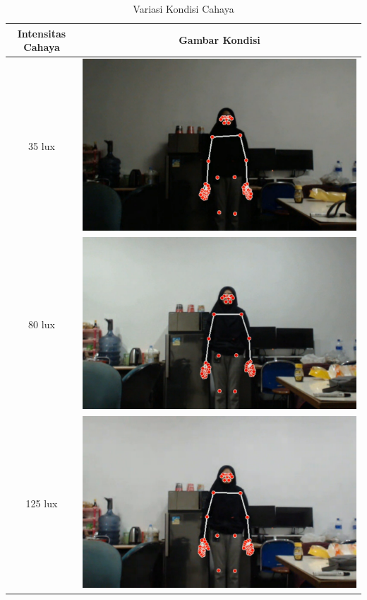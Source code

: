 \begin{longtable}{|c|c|}
  \caption{Variasi Kondisi Cahaya}
  \label{tb:kondisicahaya}                                   \\
  \hline
  \rowcolor[HTML]{C0C0C0}
  \textbf{Intensitas Cahaya} & \textbf{Gambar Kondisi}  \\
  \hline
  35 lux            &  \includegraphics[scale=0.3]{gambar/bab4-gelap.png}                \\
  \hline
  80 lux            & \includegraphics[scale=0.3]{gambar/bab4-remang.png}                 \\
  \hline
  125 lux            & \includegraphics[scale=0.3]{gambar/bab4-terang.png}                 \\
  \hline
\end{longtable}


